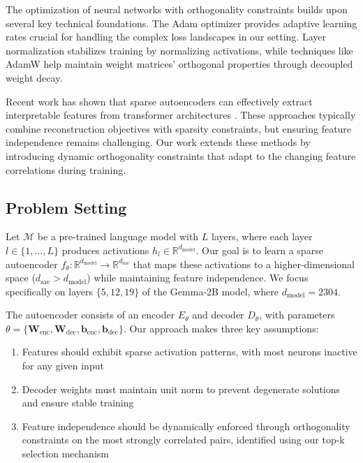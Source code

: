 \documentclass{article} %
\begin{document}
The optimization of neural networks with orthogonality constraints builds upon several key technical foundations. The Adam optimizer \cite{kingma2014adam} provides adaptive learning rates crucial for handling the complex loss landscapes in our setting. Layer normalization \cite{ba2016layer} stabilizes training by normalizing activations, while techniques like AdamW \cite{loshchilov2017adamw} help maintain weight matrices' orthogonal properties through decoupled weight decay.

Recent work has shown that sparse autoencoders can effectively extract interpretable features from transformer architectures \cite{radford2019language}. These approaches typically combine reconstruction objectives with sparsity constraints, but ensuring feature independence remains challenging. Our work extends these methods by introducing dynamic orthogonality constraints that adapt to the changing feature correlations during training.

\subsection{Problem Setting}
\label{subsec:problem}

Let $\mathcal{M}$ be a pre-trained language model with $L$ layers, where each layer $l \in \{1,\ldots,L\}$ produces activations $h_l \in \mathbb{R}^{d_{\text{model}}}$. Our goal is to learn a sparse autoencoder $f_{\theta}: \mathbb{R}^{d_{\text{model}}} \rightarrow \mathbb{R}^{d_{\text{sae}}}$ that maps these activations to a higher-dimensional space ($d_{\text{sae}} > d_{\text{model}}$) while maintaining feature independence. We focus specifically on layers $\{5, 12, 19\}$ of the Gemma-2B model, where $d_{\text{model}} = 2304$.

The autoencoder consists of an encoder $E_{\theta}$ and decoder $D_{\theta}$, with parameters $\theta = \{\mathbf{W}_{\text{enc}}, \mathbf{W}_{\text{dec}}, \mathbf{b}_{\text{enc}}, \mathbf{b}_{\text{dec}}\}$. Our approach makes three key assumptions:

\begin{enumerate}
    \item Features should exhibit sparse activation patterns, with most neurons inactive for any given input
    \item Decoder weights must maintain unit norm to prevent degenerate solutions and ensure stable training
    \item Feature independence should be dynamically enforced through orthogonality constraints on the most strongly correlated pairs, identified using our top-k selection mechanism
\end{enumerate}
\end{document}

